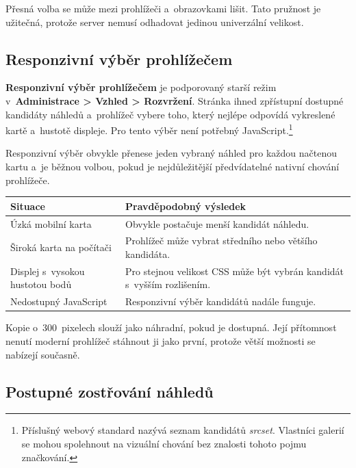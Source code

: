 \documentclass[11pt,a4paper]{article}
\newcommand{\ui}[1]{\textbf{#1}}
\begin{document}
Přesná volba se může mezi prohlížeči a~obrazovkami lišit. Tato pružnost je
užitečná, protože server nemusí odhadovat jedinou univerzální velikost.

\subsection{Responzivní výběr prohlížečem}

\ui{Responzivní výběr prohlížečem} je podporovaný starší režim
v~\ui{Administrace > Vzhled > Rozvržení}. Stránka ihned zpřístupní dostupné
kandidáty náhledů a~prohlížeč vybere toho, který nejlépe odpovídá vykreslené
kartě a~hustotě displeje. Pro tento výběr není potřebný
JavaScript.\footnote{Příslušný webový standard nazývá seznam kandidátů
\emph{srcset}. Vlastníci galerií se mohou spolehnout na vizuální chování bez
znalosti tohoto pojmu značkování.}

Responzivní výběr obvykle přenese jeden vybraný náhled pro každou načtenou kartu
a~je běžnou volbou, pokud je nejdůležitější předvídatelné nativní chování
prohlížeče.

\begin{tabularx}{\textwidth}{>{\RaggedRight\arraybackslash}p{} X}
\toprule
\textbf{Situace} & \textbf{Pravděpodobný výsledek}\\
\midrule
Úzká mobilní karta & Obvykle postačuje menší kandidát náhledu.\\
Široká karta na počítači & Prohlížeč může vybrat středního nebo většího
kandidáta.\\
Displej s~vysokou hustotou bodů & Pro stejnou velikost CSS může být vybrán
kandidát s~vyšším rozlišením.\\
Nedostupný JavaScript & Responzivní výběr kandidátů nadále funguje.\\
\bottomrule
\end{tabularx}

Kopie o~300~pixelech slouží jako náhradní, pokud je dostupná. Její přítomnost
nenutí moderní prohlížeč stáhnout ji jako první, protože větší možnosti se
nabízejí současně.

\subsection{Postupné zostřování náhledů}
\end{document}
